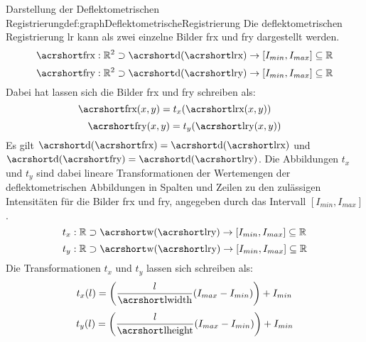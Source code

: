 \begin{Definition}{Darstellung der Deflektometrischen Registrierung}{def:graphDeflektometrischeRegistrierung}
	Die deflektometrischen Registrierung \acrshort{lr} kann als zwei einzelne Bilder \acrshort{frx} und \acrshort{fry} dargestellt werden.
	\begin{equation*}
		\acrshortmath{frx} : \mathbb{R}^2 \supset \acrshortmath{d}(\acrshortmath{lrx}) \rightarrow [I_{min},I_{max}] \subseteq \mathbb{R}
	\end{equation*}
	\begin{equation*}
		\acrshortmath{fry} : \mathbb{R}^2 \supset \acrshortmath{d}(\acrshortmath{lry}) \rightarrow [I_{min},I_{max}] \subseteq \mathbb{R}
	\end{equation*}
	Dabei hat lassen sich die Bilder \acrshort{frx} und \acrshort{fry} schreiben als:
	\begin{equation*}
		\acrshortmath{frx}(x,y) = t_x(\acrshortmath{lrx}(x,y))
		\qquad
	\end{equation*}
	\begin{equation*}
		\acrshortmath{fry}(x,y) = t_y(\acrshortmath{lry}(x,y))
	\end{equation*}
	Es gilt $\acrshortmath{d}(\acrshortmath{frx}) = \acrshortmath{d}(\acrshortmath{lrx})$ und $\acrshortmath{d}(\acrshortmath{fry}) = \acrshortmath{d}(\acrshortmath{lry})$.
	Die Abbildungen $t_x$ und $t_y$ sind dabei lineare Transformationen der Wertemengen der deflektometrischen Abbildungen in Spalten und Zeilen zu den zulässigen Intensitäten für die Bilder \acrshort{frx} und \acrshort{fry}, angegeben durch das Intervall $[I_{min},I_{max}]$.
	\begin{equation*}
		t_x : \mathbb{R} \supset \acrshortmath{w}(\acrshortmath{lry}) \rightarrow [I_{min},I_{max}] \subseteq \mathbb{R}
	\end{equation*}
	\begin{equation*}
		t_y : \mathbb{R} \supset \acrshortmath{w}(\acrshortmath{lry}) \rightarrow [I_{min},I_{max}] \subseteq \mathbb{R}
	\end{equation*}
	Die Transformationen $t_x$ und $t_y$ lassen sich schreiben als:
	\begin{equation*}
		t_x(l) = \left(\dfrac{l}{\acrshortmath{lwidth}}(I_{max} - I_{min})\right) + I_{min}
	\end{equation*}
	\begin{equation*}
		t_y(l) = \left(\dfrac{l}{\acrshortmath{lheight}}(I_{max} - I_{min})\right) + I_{min}
	\end{equation*}
\end{Definition}
